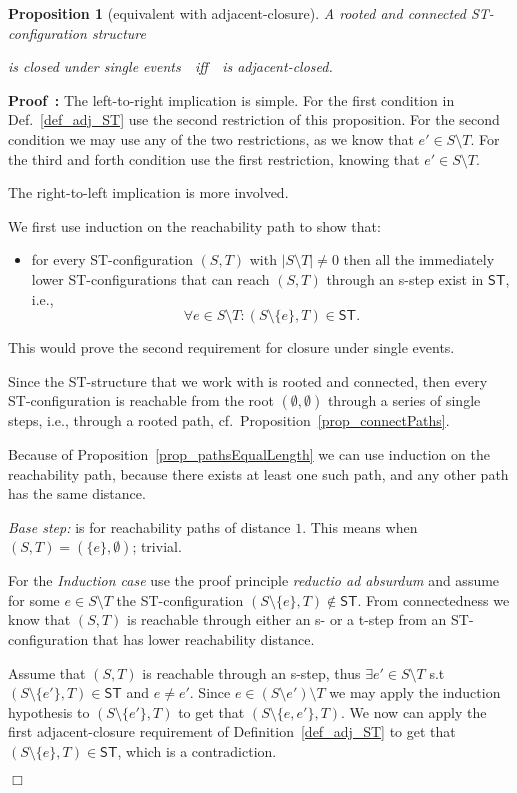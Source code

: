 \documentclass[submission,copyright,creativecommons]{eptcs}
\newtheorem{proposition}[theorem]{Proposition}
\newenvironment{proof}[1][\!\!\,]{\vspace{1ex}\noindent\textbf{Proof #1: }}{\hfill$\Box$\vspace{2ex}}
\newcounter{case}
\newcommand\ST{\ensuremath{\mathsf{ST}}}
\newcommand\ststruct{\ensuremath{\ST}}
\begin{document}
\begin{proposition}[equivalent with adjacent-closure]\label{prop_adj_equiv}
A rooted and connected ST-con\-figuration structure 


\centerline{is closed under single events\ \ iff\ \ is adjacent-closed.}
\end{proposition}

\begin{proof}
The left-to-right implication is simple. For the first condition in Def.~\ref{def_adj_ST} use the second restriction of this proposition. For the second condition we may use any of the two restrictions, as we know that $e'\in S\setminus T$.  For the third and forth condition use the first restriction, knowing that $e'\in S\setminus T$.

The right-to-left implication is more involved.

We first use induction on the reachability path to show that: 
\begin{itemize}
\item[] for every ST-configuration $(S,T)$ with $|S\setminus T|\neq 0$ then all the immediately lower ST-configurations that can reach $(S,T)$ through an s-step exist in \ststruct, i.e., 
\[
\forall e\in S\setminus T:(S\setminus \{e\},T)\in\ststruct.
\]
\end{itemize}
This would prove the second requirement for closure under single events.

Since the ST-structure that we work with is rooted and connected, then every ST-configuration is reachable from the root $(\emptyset,\emptyset)$ through a series of single steps, i.e., through a rooted path, cf.\ Proposition~\ref{prop_connectPaths}. 


Because of Proposition~\ref{prop_pathsEqualLength} we can use induction on the reachability path, because there exists at least one such path, and any other path has the same distance.

\textit{Base step:} is for reachability paths of distance $1$. This means when $(S,T)=(\{e\},\emptyset)$; trivial.

For the \textit{Induction case} use the proof principle \textit{reductio ad absurdum} and assume for some $e\in S\setminus T$ the ST-configuration $(S\setminus\{e\},T)\not\in\ststruct$. From connectedness we know that  $(S,T)$ is reachable through either an s- or a t-step from an ST-configuration that has lower reachability distance.

Assume that $(S,T)$ is reachable through an s-step, thus $\exists e'\in S\setminus T$ s.t\ $(S\setminus\{e'\},T)\in\ststruct$ and $e\neq e'$. Since $e\in(S\setminus e')\setminus T$ we may apply the induction hypothesis to $(S\setminus\{e'\},T)$ to get that $(S\setminus\{e,e'\},T)$. We now can apply the first adjacent-closure requirement of Definition~\ref{def_adj_ST} to get that $(S\setminus\{e\},T)\in\ststruct$, which is a contradiction.


\end{proof}
\end{document}
